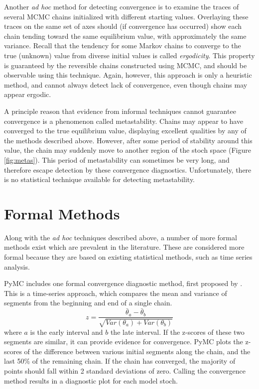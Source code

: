 \documentclass[]{book}
\begin{document}
Another \emph{ad hoc} method for detecting convergence is to examine the traces of several MCMC chains initialized with different starting values. Overlaying these traces on the same set of axes should (if convergence has occurred) show each chain tending toward the same equilibrium value, with approximately the same variance. Recall that the tendency for some Markov chains to converge to the true (unknown) value from diverse initial values is called \emph{ergodicity}. This property is guaranteed by the reversible chains constructed using MCMC, and should be observable using this technique. Again, however, this approach is only a heuristic method, and cannot always detect lack of convergence, even though chains may appear ergodic.

A principle reason that evidence from informal techniques cannot guarantee convergence is a phenomenon called metastability. Chains may appear to have converged to the true equilibrium value, displaying excellent qualities by any of the methods described above. However, after some period of stability around this value, the chain may suddenly move to another region of the stoch space (Figure \ref{fig:metas}). This period of metastability can sometimes be very long, and therefore escape detection by these convergence diagnostics. Unfortunately, there is no statistical technique available for detecting metastability.

\section*{Formal Methods}

Along with the \emph{ad hoc} techniques described above, a number of more formal methods exist which are prevalent in the literature. These are considered more formal because they are based on existing statistical methods, such as time series analysis.

PyMC includes one formal convergence diagnostic method, first proposed by \citet{Geweke:1992gm}. This is a time-series approach, which compares the mean and variance of segments from the beginning and end of a single chain.
\begin{equation}
z = \frac{\bar{\theta}_a - \bar{\theta}_b}{\sqrt{Var(\theta_a) + Var(\theta_b)}}
\end{equation}
where $a$ is the early interval and $b$ the late interval. If the z-scores of these two segments are similar, it can provide evidence for convergence. PyMC plots the z-scores of the difference between various initial segments along the chain, and the last 50\% of the remaining chain. If the chain has converged, the majority of points should fall within 2 standard deviations of zero. Calling the convergence method results in a diagnostic plot for each model stoch.
\end{document}
